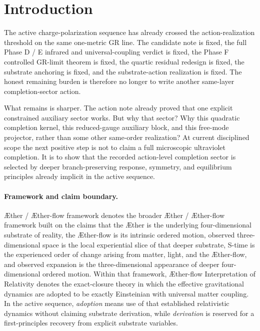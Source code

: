 \documentclass[11pt]{article}
\newcommand{\Aether}{\AE{}ther}
\newcommand{\Aflow}{\AE{}ther-flow}
\newcommand{\TheoryName}{\Aflow{} Interpretation of Relativity}
\newcommand{\TheoryProgram}{\Aether{} / \Aflow{} framework}
\begin{document}
\begin{abstract}
Consequently the same eliminated completion solve is recovered again, hence the same completed observer equation, the same one operative metric, and the same recorded Phase D / E and Phase F package. The positive result is disciplined and narrower than stronger promotion language: the action-level completion sector is no longer only an explicit representative, but it is still not claimed to be the unique final microscopic ultraviolet derivation.
\end{abstract}

\section{Introduction}

The active charge-polarization sequence has already crossed the action-realization threshold on the same one-metric GR line. The candidate note is fixed, the full Phase D / E infrared and universal-coupling verdict is fixed, the Phase F controlled GR-limit theorem is fixed, the quartic residual redesign is fixed, the substrate anchoring is fixed, and the substrate-action realization is fixed. The honest remaining burden is therefore no longer to write another same-layer completion-sector action.

What remains is sharper. The action note already proved that one explicit constrained auxiliary sector works. But why that sector? Why this quadratic completion kernel, this reduced-gauge auxiliary block, and this free-mode projector, rather than some other same-order realization? At current disciplined scope the next positive step is not to claim a full microscopic ultraviolet completion. It is to show that the recorded action-level completion sector is selected by deeper branch-preserving response, symmetry, and equilibrium principles already implicit in the active sequence.

\paragraph{Framework and claim boundary.}
\TheoryProgram{} denotes the broader \Aether{} / \Aflow{} framework built on the claims that the \Aether{} is the underlying four-dimensional substrate of reality, the \Aflow{} is its intrinsic ordered motion, observed three-dimensional space is the local experiential slice of that deeper substrate, S-time is the experienced order of change arising from matter, light, and the \Aflow{}, and observed expansion is the three-dimensional appearance of deeper four-dimensional ordered motion. Within that framework, \TheoryName{} denotes the exact-closure theory in which the effective gravitational dynamics are adopted to be exactly Einsteinian with universal matter coupling. In the active sequence, \emph{adoption} means use of that established relativistic dynamics without claiming substrate derivation, while \emph{derivation} is reserved for a first-principles recovery from explicit substrate variables.
\end{document}
